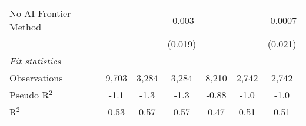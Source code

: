\begin{tabular}{lcccccc}
   No AI Frontier - Method &                &               & -0.003        &                &               & -0.0007\\   
                           &                &               & (0.019)       &                &               & (0.021)\\   
   \midrule
   \emph{Fit statistics}\\
   Observations            & 9,703          & 3,284         & 3,284         & 8,210          & 2,742         & 2,742\\  
   Pseudo R$^2$            & -1.1           & -1.3          & -1.3          & -0.88          & -1.0          & -1.0\\  
   R$^2$                   & 0.53           & 0.57          & 0.57          & 0.47           & 0.51          & 0.51\\  
   

\end{tabular}
